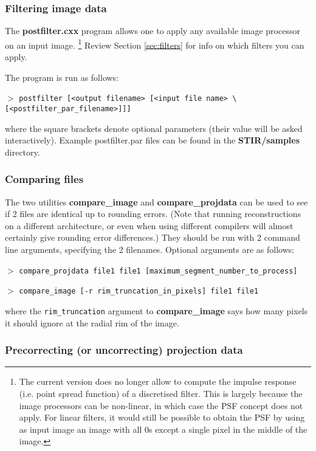 \documentclass{article}
\newcommand{\cmdline}[1]{\par \noindent $>$ \texttt{#1}\par}
\begin{document}
{\subsubsection{
Filtering image data}

The \textbf{postfilter.cxx} program allows one to apply any available 
image processor on an input image. \footnote{{\small The current version 
does no longer allow to compute the impulse response (i.e. point 
spread function) of a discretised filter. This is largely because 
the image processors can be non-linear, in which case the PSF 
concept does not apply. For linear filters, it would still be 
possible to obtain the PSF by using as input image an image with 
all 0s except a single pixel in the middle of the image.}} Review 
Section \ref{sec:filters} for info on which filters you can apply.


The program is run as follows:
\cmdline{postfilter [\texttt{<}output filename\texttt{>} [\texttt{<}input file 
name\texttt{>} {\textbackslash}\\
{[}\texttt{<}postfilter\_par\_filename\texttt{>}]]]}

where the square brackets denote optional parameters (their value 
will be asked interactively). Example postfilter.par files can 
be found in the \textbf{STIR/samples} directory.


\subsubsection{
Comparing files}

The two utilities \textbf{compare\_image} and \textbf{compare\_projdata} 
can be used to see if 2 files are identical up to rounding errors. 
(Note that running reconstructions on a different architecture, 
or even when using different compilers will almost certainly 
give rounding error differences.) They should be run with 2 command 
line arguments, specifying the 2 filenames. Optional arguments 
are as follows:
\cmdline{compare\_projdata file1 file1 
[maximum\_segment\_number\_to\_process]}
\cmdline{compare\_image [-r rim\_truncation\_in\_pixels] file1 file1}


where the \texttt{rim\_truncation} argument to \textbf{compare\_image}  says 
how many pixels it should ignore at the radial rim of the image.



\subsubsection{
Precorrecting (or uncorrecting) projection data}

}
\end{document}
